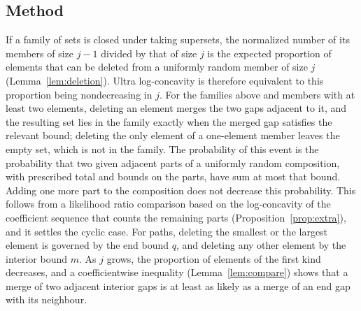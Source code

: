 \documentclass{amsart}
\theoremstyle{definition}
\theoremstyle{remark}
\numberwithin{equation}{section}
\begin{document}
\subsection*{Method}
If a family of sets is closed under taking supersets, the normalized number of its members of size $j-1$ divided by that of size $j$ is the expected proportion of elements that can be deleted from a uniformly random member of size $j$ (Lemma~\ref{lem:deletion}). Ultra log-concavity is therefore equivalent to this proportion being nondecreasing in $j$. For the families above and members with at least two elements, deleting an element merges the two gaps adjacent to it, and the resulting set lies in the family exactly when the merged gap satisfies the relevant bound; deleting the only element of a one-element member leaves the empty set, which is not in the family. The probability of this event is the probability that two given adjacent parts of a uniformly random composition, with prescribed total and bounds on the parts, have sum at most that bound. Adding one more part to the composition does not decrease this probability. This follows from a likelihood ratio comparison based on the log-concavity of the coefficient sequence that counts the remaining parts (Proposition~\ref{prop:extra}), and it settles the cyclic case. For paths, deleting the smallest or the largest element is governed by the end bound $q$, and deleting any other element by the interior bound $m$. As $j$ grows, the proportion of elements of the first kind decreases, and a coefficientwise inequality (Lemma~\ref{lem:compare}) shows that a merge of two adjacent interior gaps is at least as likely as a merge of an end gap with its neighbour.
\end{document}
